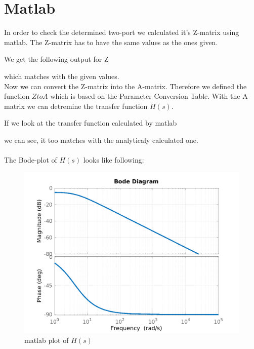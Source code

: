 \documentclass[a4paper]{article}
\begin{document}
\section{Matlab}
In order to check the determined two-port we calculated it's Z-matrix using matlab. 
The Z-matrix has to have the same values as the ones given.

We get the following output for Z

which matches with the given values.
\\
Now we can convert the Z-matrix into the A-matrix. Therefore we defined the function $ZtoA$ which is based on the Parameter Conversion Table.
With the A-matrix we can detremine the transfer function $H(s)$.

If we look at the transfer function calculated by matlab

we can see, it too matches with the analyticaly calculated one.\\
\\
The Bode-plot of $H(s)$ looks like following:
\begin{figure}[ht] \centering
  \includegraphics[scale=0.9]{./../matlab/ue_10.png}
  \caption{matlab plot of $H(s)$}
\end{figure}

\pagebreak
\end{document}
